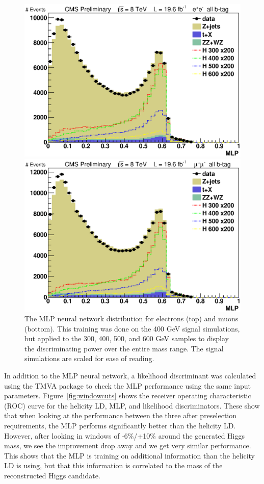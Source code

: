 \begin{figure}[htb!]
\begin{center}
\centerline{
\includegraphics[width=0.8\linewidth]{Optimization/MLP_el.eps}
}
\centerline{
\includegraphics[width=0.8\linewidth]{Optimization/MLP_mu.eps}
}
\caption{
The MLP neural network distribution for electrons (top) and muons (bottom).  This training was done on the 400 GeV signal simulations, but applied to the 300, 400, 500, and 600 GeV samples to display the discriminating power over the entire mass range.  The signal simulations are scaled for ease of reading.
}
\label{fig:NNOutput}
\end{center}
\end{figure}

In addition to the MLP neural network, a likelihood discriminant was calculated using the TMVA package to check the MLP performance using the same input parameters.  Figure~\ref{fig:windowcuts} shows the receiver operating characteristic (ROC) curve for the helicity LD, MLP, and likelihood discriminators. These show that when looking at the performance between the three after preselection requirements, the MLP performs significantly better than the helicity LD. However, after looking in windows of -6\%/+10\% around the generated Higgs mass, we see the improvement drop away and we get very similar performance.  This shows that the MLP is training on additional information than the helicity LD is using, but that this information is correlated to the mass of the reconstructed Higgs candidate.  


